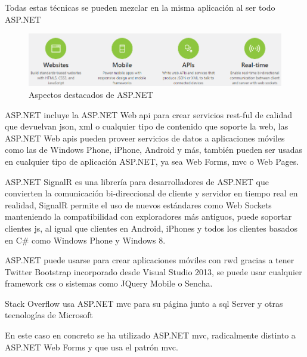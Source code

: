 Todas estas técnicas se pueden mezclar en la misma aplicación al ser todo ASP.NET

\begin{figure}[!htbp]
	\centering
	\includegraphics[scale=0.6]{fig/asp-net_highlights}
	\caption{Aspectos destacados de ASP.NET}
\end{figure}

ASP.NET incluye la ASP.NET Web \acrshort{api} para crear servicios \acrshort{rest}-ful de calidad que devuelvan \acrshort{json}, \acrshort{xml} o cualquier tipo de contenido que soporte la web, las ASP.NET Web \acrshort{api}s pueden proveer servicios de datos a aplicaciones móviles como las de Windows Phone, iPhone, Android y más, también pueden ser usadas en cualquier tipo de aplicación ASP.NET, ya sea Web Forms, \acrshort{mvc} o Web Pages.

ASP.NET SignalR es una librería para desarrolladores de ASP.NET que convierten la comunicación bi-direccional de cliente y servidor en tiempo real en realidad, SignalR permite el uso de nuevos estándares como Web Sockets manteniendo la compatibilidad con exploradores más antiguos, puede soportar clientes \acrfull{js}, al igual que clientes en Android, iPhones y todos los clientes basados en C# como Windows Phone y Windows 8.

ASP.NET puede usarse para crear aplicaciones móviles con \acrshort{rwd} gracias a tener Twitter Bootstrap incorporado desde Visual Studio 2013, se puede usar cualquier framework \acrshort{css} o sistemas como JQuery Mobile o Sencha.

Stack Overflow\cite{StackOverflow} usa ASP.NET \acrshort{mvc} para su página junto a \acrshort{sql} Server y otras tecnologías de Microsoft

En este caso en concreto se ha utilizado ASP.NET \acrshort{mvc}, radicalmente distinto a ASP.NET Web Forms y que usa el patrón \acrfull{mvc}.

